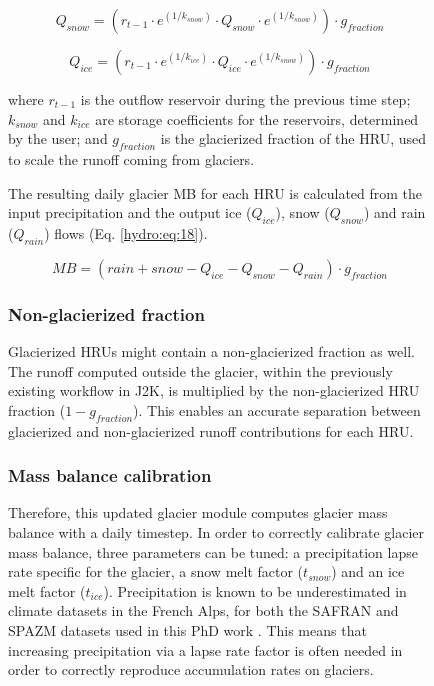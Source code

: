 \begin{figure}[h]
\begin{equation} \label{hydro:eq:16}
Q_{snow} = (r_{t-1 }\cdot e^{(1/k_{snow})} \cdot Q_{snow} \cdot e^{(1/k_{snow})}) \cdot g_{fraction}
\end{equation} 

\begin{equation} \label{hydro:eq:17}
Q_{ice} = (r_{t-1} \cdot e^{(1/k_{ice})} \cdot Q_{ice} \cdot e^{(1/k_{snow})}) \cdot g_{fraction}
\end{equation} 

where $r_{t-1}$ is the outflow reservoir during the previous time step; $k_{snow}$ and $k_{ice}$ are storage coefficients for the reservoirs, determined by the user; and $g_{fraction}$ is the glacierized fraction of the HRU, used to scale the runoff coming from glaciers. 

The resulting daily glacier MB for each HRU is calculated from the input precipitation and the output ice ($Q_{ice}$), snow ($Q_{snow}$) and rain ($Q_{rain}$) flows (Eq. \ref{hydro:eq:18}).

\begin{equation} \label{hydro:eq:18}
MB = (rain + snow - Q_{ice} - Q_{snow} - Q_{rain}) \cdot g_{fraction}
\end{equation} 

\subsubsection{Non-glacierized fraction}

Glacierized HRUs might contain a non-glacierized fraction as well. The runoff computed outside the glacier, within the previously existing workflow in J2K, is multiplied by the non-glacierized HRU fraction ($1 - g_{fraction}$). This enables an accurate separation between glacierized and non-glacierized runoff contributions for each HRU. 

\subsubsection{Mass balance calibration}

Therefore, this updated glacier module computes glacier mass balance with a daily timestep. In order to correctly calibrate glacier mass balance, three parameters can be tuned: a precipitation lapse rate specific for the glacier, a snow melt factor ($t_{snow}$) and an ice melt factor ($t_{ice}$). Precipitation is known to be underestimated in climate datasets in the French Alps, for both the SAFRAN and SPAZM datasets used in this PhD work \citep{vionnet_numerical_2016}. This means that increasing precipitation via a lapse rate factor is often needed in order to correctly reproduce accumulation rates on glaciers. 


\end{figure}
